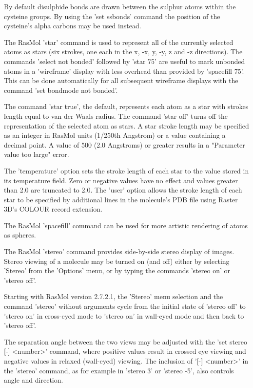 By default disulphide bonds are drawn between the sulphur atoms within
the cysteine groups. By using the
'set ssbonds'
command the position of the cysteine's alpha carbons may be used instead.

The RasMol
'star'
command is used to represent all of the currently selected atoms as
stars (six strokes, one each in the x, -x, y, -y, z and -z directions).
The commands
'select not bonded'
followed by
'star 75'
are useful to mark unbonded atoms in a
'wireframe'
display with less overhead than provided by
'spacefill 75'.
This can be done automatically for all subsequent wireframe
displays with the command
'set bondmode not bonded'.

The command
'star true',
the default, represents each atom as a star with strokes
length equal to van der Waals radius.
The command
'star off'
turns off the representation of the selected atom as stars. A star
stroke length may be specified as an integer in RasMol units
(1/250th Angstrom)
or a value containing a decimal point. A value of 500 (2.0
Angstroms) or greater results in a "Parameter value too large" error.

The
'temperature'
option sets the stroke length of each star to the value stored
in its temperature
field. Zero or negative values have no effect and values greater than
2.0 are truncated to 2.0.  The
'user'
option allows the stroke length of each star to be specified by
additional lines
in the molecule's PDB file using Raster 3D's COLOUR record extension.

The RasMol
'spacefill'
command can be used for more artistic rendering of atoms as spheres.

The RasMol
'stereo'
command provides side-by-side stereo display of images. Stereo
viewing of a molecule may be turned on (and off) either by
selecting
'Stereo'
from the
'Options'
menu, or by
typing the commands
'stereo on'
or
'stereo off'.

Starting with RasMol version 2.7.2.1, the
'Stereo'
menu selection and the command
'stereo'
without arguments cycle from the initial state of
'stereo off'
to
'stereo on'
in cross-eyed mode to
'stereo on'
in wall-eyed mode and then back to
'stereo off'.

The separation angle between
the two views may be adjusted with the
'set stereo [-] <number>'
command, where positive values result in crossed eye
viewing and negative values in relaxed (wall-eyed) viewing.
The inclusion of
'[-] <number>'
in the
'stereo'
command, as for example in
'stereo 3'
or
'stereo -5',
also controls angle and direction.

